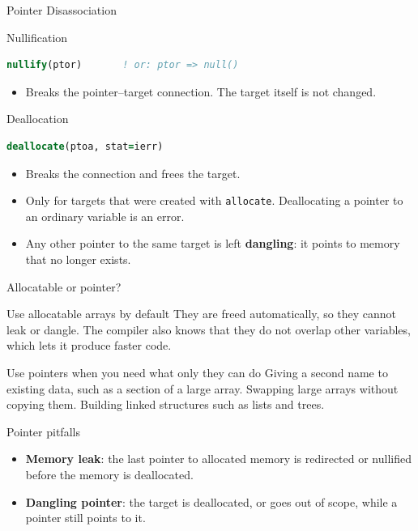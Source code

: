 \begin{frame}[fragile]{Pointer Disassociation}
  \begin{block}{Nullification}
\begin{lstlisting}[language=Fortran]
nullify(ptor)       ! or: ptor => null()
\end{lstlisting}
    \begin{itemize}
      \item Breaks the pointer–target connection. The target itself is not changed.
    \end{itemize}
  \end{block}

  \begin{block}{Deallocation}
\begin{lstlisting}[language=Fortran]
deallocate(ptoa, stat=ierr)
\end{lstlisting}
    \begin{itemize}
      \item Breaks the connection and frees the target.
      \item Only for targets that were created with \texttt{allocate}. Deallocating a pointer to an ordinary variable is an error.
      \item Any other pointer to the same target is left \textbf{dangling}: it points to memory that no longer exists.
    \end{itemize}
  \end{block}
\end{frame}


\begin{frame}{Allocatable or pointer?}
  \begin{block}{Use allocatable arrays by default}
    They are freed automatically, so they cannot leak or dangle. The compiler also knows that they do not overlap other variables, which lets it produce faster code.
  \end{block}
  \begin{block}{Use pointers when you need what only they can do}
    Giving a second name to existing data, such as a section of a large array. Swapping large arrays without copying them. Building linked structures such as lists and trees.
  \end{block}
  \begin{block}{Pointer pitfalls}
    \begin{itemize}
      \item \textbf{Memory leak}: the last pointer to allocated memory is redirected or nullified before the memory is deallocated.
      \item \textbf{Dangling pointer}: the target is deallocated, or goes out of scope, while a pointer still points to it.
    \end{itemize}
  \end{block}
\end{frame}



